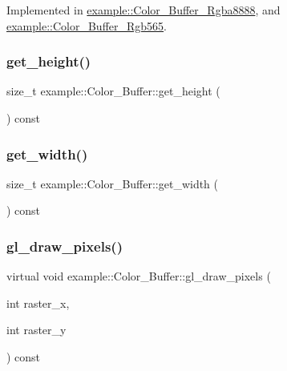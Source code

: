 Implemented in \mbox{\hyperlink{classexample_1_1_color___buffer___rgba8888_ab2e7a20a9dd24c5dd422d143d9a2d391}{example\+::\+Color\+\_\+\+Buffer\+\_\+\+Rgba8888}}, and \mbox{\hyperlink{classexample_1_1_color___buffer___rgb565_ad8125e1f708bd99aafce8ef7b713cc02}{example\+::\+Color\+\_\+\+Buffer\+\_\+\+Rgb565}}.

\mbox{\label{classexample_1_1_color___buffer_a4d1495a260205b83e1bd28dd04c6eda2}} 
\subsubsection{\texorpdfstring{get\_height()}{get\_height()}}
{\footnotesize\ttfamily size\+\_\+t example\+::\+Color\+\_\+\+Buffer\+::get\+\_\+height (\begin{DoxyParamCaption}{ }\end{DoxyParamCaption}) const\hspace{0.3cm}{\ttfamily [inline]}}

\mbox{\label{classexample_1_1_color___buffer_a0bbc4a120bc04b512e303baf8330ff82}} 
\subsubsection{\texorpdfstring{get\_width()}{get\_width()}}
{\footnotesize\ttfamily size\+\_\+t example\+::\+Color\+\_\+\+Buffer\+::get\+\_\+width (\begin{DoxyParamCaption}{ }\end{DoxyParamCaption}) const\hspace{0.3cm}{\ttfamily [inline]}}

\mbox{\label{classexample_1_1_color___buffer_a793b667028b2eb7efde2cee76066eac7}} 
\subsubsection{\texorpdfstring{gl\_draw\_pixels()}{gl\_draw\_pixels()}}
{\footnotesize\ttfamily virtual void example\+::\+Color\+\_\+\+Buffer\+::gl\+\_\+draw\+\_\+pixels (\begin{DoxyParamCaption}\item[{int}]{raster\+\_\+x,  }\item[{int}]{raster\+\_\+y }\end{DoxyParamCaption}) const\hspace{0.3cm}{\ttfamily [pure virtual]}}



